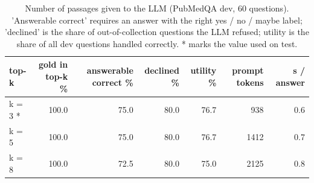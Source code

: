 \begin{table}[t]
\centering\small
\begin{tabular}{lrrrrrr}
\toprule
top-k & gold in top-k \% & answerable correct \% & declined \% & utility \% & prompt tokens & s / answer \\
\midrule
k = 3 * & 100.0 & 75.0 & 80.0 & 76.7 & 938 & 0.6 \\
k = 5 & 100.0 & 75.0 & 80.0 & 76.7 & 1412 & 0.7 \\
k = 8 & 100.0 & 72.5 & 80.0 & 75.0 & 2125 & 0.8 \\
\bottomrule
\end{tabular}
\caption{Number of passages given to the LLM (PubMedQA dev, 60 questions). 'Answerable correct' requires an answer with the right yes / no / maybe label; 'declined' is the share of out-of-collection questions the LLM refused; utility is the share of all dev questions handled correctly. * marks the value used on test.}
\label{tab:ablation_topk}
\end{table}
